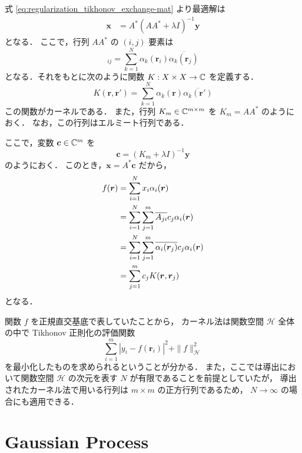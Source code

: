 式 \eqref{eq:regularization_tikhonov_exchange-mat} より最適解は
\begin{align}
    \bm{x} & = A^* (AA^* + \lambda I)^{-1} \bm{y}
\end{align}
となる．
ここで，行列 $AA^*$ の $(i, j)$ 要素は
\begin{equation}
    [AA^*]_{ij} = \sum_{k = 1}^{N} \alpha_k(\bm{r}_i) \overline{\alpha_k(\bm{r}_j)}
\end{equation}
となる．それをもとに次のように関数 $K : X \times X \to \mathbb{C}$ を定義する．
\begin{equation}
    K(\bm{r}, \bm{r}') = \sum_{k = 1}^{N} \alpha_k(\bm{r}) \overline{\alpha_k(\bm{r}')}
\end{equation}
この関数がカーネルである．
また，行列 $K_m \in \mathbb{C}^{m \times m}$ を
$K_m = AA^*$ のようにおく．
なお，この行列はエルミート行列である．

ここで，変数 $\bm{c} \in \mathbb{C}^m$ を
\begin{equation}
    \bm{c} = (K_m + \lambda I)^{-1} \bm{y}
\end{equation}
のようにおく．
このとき，$\bm{x} = A^* \bm{c}$ だから，
\begin{align}
    f(\bm{r})
     & = \sum_{i = 1}^{N} x_i \alpha_i(\bm{r}) \notag                                                \\
     & = \sum_{i = 1}^{N} \sum_{j = 1}^{m} \overline{A_{ji}} c_j \alpha_i(\bm{r}) \notag             \\
     & = \sum_{i = 1}^{N} \sum_{j = 1}^{m} \overline{\alpha_i(\bm{r}_j)} c_j \alpha_i(\bm{r}) \notag \\
     & = \sum_{j = 1}^{m} c_j K(\bm{r}, \bm{r}_j)
\end{align}
となる．

関数 $f$ を正規直交基底で表していたことから，
カーネル法は関数空間 $\mathcal{H}$ 全体の中で Tikhonov 正則化の評価関数
\begin{equation}
    \sum_{i=1}^m \left|y_i - f(\bm{r}_i)\right|^2
    + \|f\|_{\mathcal{H}}^2
\end{equation}
を最小化したものを求められるということが分かる．
また，ここでは導出において関数空間 $\mathcal{H}$ の次元を表す $N$ が有限であることを前提としていたが，
導出されたカーネル法で用いる行列は $m \times m$ の正方行列であるため，
$N \to \infty$ の場合にも適用できる．

\section{Gaussian Process}\label{sec:regularization_kernel_gaussian-process}

